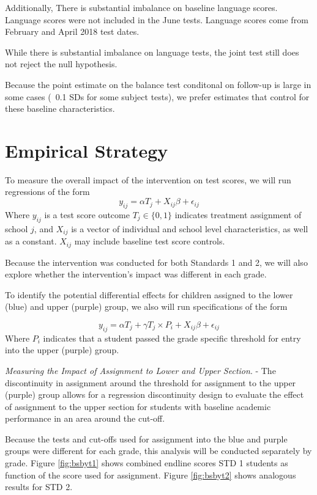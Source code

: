 \documentclass[10pt]{article}
\begin{document}
Additionally, There is substantial imbalance on baseline language scores. Language scores were not included in the June tests. Language scores come from February and April 2018 test dates. 

While there is substantial imbalance on language tests, the joint test still does not reject the null hypothesis. 

\begin{landscape}

\end{landscape}

Because the point estimate on the balance test conditonal on follow-up is large in some cases (~0.1 SDs for some subject tests), we prefer estimates that control for these baseline characteristics. 

\section{Empirical Strategy}

To measure the overall impact of the intervention on test scores, we will run regressions of the form
\[ y_{ij} = \alpha T_j + X_{ij} \beta + \epsilon_{ij} \]
Where $y_{ij}$ is a test score outcome $T_j \in \{0,1\}$ indicates  treatment assignment of school $j$, and $X_{ij}$ is a vector of individual and school level characteristics, as well as a constant. $X_{ij}$ may include baseline test score controls.

Because the intervention was conducted for both Standards 1 and 2, we will also explore whether the intervention's impact was different in each grade.

To identify the potential differential effects for children assigned to the lower (blue) and upper (purple) group, we also will run specifications of the form

\[ y_{ij} = \alpha T_j + \gamma T_j \times P_{i} + X_{ij} \beta + \epsilon_{ij} \]
Where $P_i$ indicates that a student passed the grade specific threshold for entry into the upper (purple) group. 

\textit{Measuring the Impact of Assignment to Lower and Upper Section}. - The discontinuity in assignment around the threshold for assignment to the upper (purple) group allows for a regression discontinuity design to evaluate the effect of assignment to the upper section for students with baseline academic performance in an area around the cut-off. 

Because the tests and cut-offs used for assignment into the blue and purple groups were different for each grade, this analysis will be conducted separately by grade. Figure \ref{fig:bsbyt1} shows combined endline scores STD 1 students as function of the score used for assignment. Figure \ref{fig:bsbyt2} shows analogous results for STD 2. 
\end{document}
